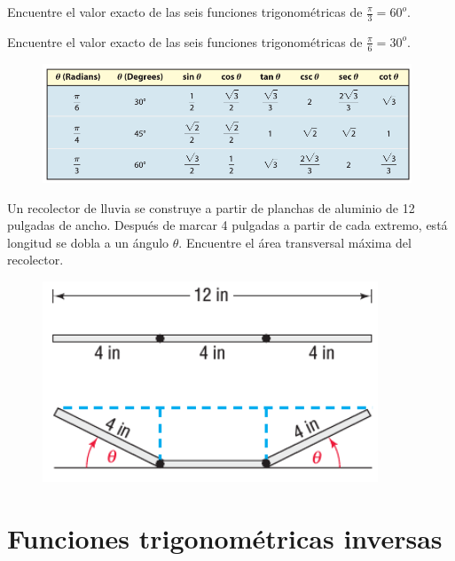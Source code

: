 {}
	\begin{problema}
		\label{exmp:0606}
		Encuentre el valor exacto de las seis funciones trigonométricas de $\frac{\pi}{3}=60^{o}$.
	\end{problema}
	

{}
	\begin{problema}
		\label{exmp:0607}
		Encuentre el valor exacto de las seis funciones trigonométricas de $\frac{\pi}{6}=30^{o}$.
	\end{problema}
	

{}
	\begin{figure}
		\centering
		\includegraphics[width=11cm,keepaspectratio=true]{./trig/sull06t3.png}
		\label{fig:tab3}
	\end{figure}
	

{}
	\begin{problema}
		Un recolector de lluvia se construye a partir de planchas de aluminio de 12 pulgadas de ancho. Después de marcar 4 pulgadas a partir de cada extremo, está longitud se dobla a un ángulo $\theta$. Encuentre el área transversal máxima del recolector. 
	\end{problema}


	\begin{figure}
		\centering
		\includegraphics[width=10cm,keepaspectratio=true]{./trig/sull0627.png}
		\label{fig:0627}
	\end{figure}



\section{Funciones trigonométricas inversas}

